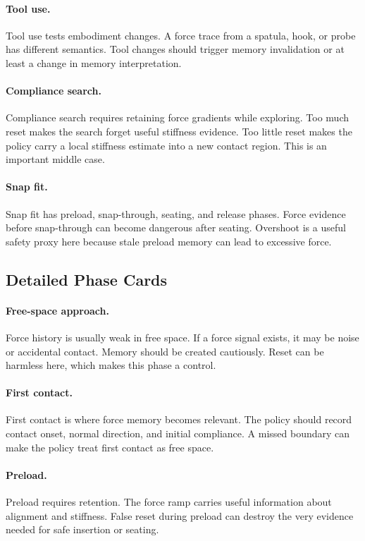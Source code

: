 \documentclass{article}
\begin{document}
\paragraph{Tool use.}
Tool use tests embodiment changes. A force trace from a spatula, hook, or probe
has different semantics. Tool changes should trigger memory invalidation or at
least a change in memory interpretation.

\paragraph{Compliance search.}
Compliance search requires retaining force gradients while exploring. Too much
reset makes the search forget useful stiffness evidence. Too little reset makes
the policy carry a local stiffness estimate into a new contact region. This is
an important middle case.

\paragraph{Snap fit.}
Snap fit has preload, snap-through, seating, and release phases. Force evidence
before snap-through can become dangerous after seating. Overshoot is a useful
safety proxy here because stale preload memory can lead to excessive force.

\subsection{Detailed Phase Cards}

\paragraph{Free-space approach.}
Force history is usually weak in free space. If a force signal exists, it may be
noise or accidental contact. Memory should be created cautiously. Reset can be
harmless here, which makes this phase a control.

\paragraph{First contact.}
First contact is where force memory becomes relevant. The policy should record
contact onset, normal direction, and initial compliance. A missed boundary can
make the policy treat first contact as free space.

\paragraph{Preload.}
Preload requires retention. The force ramp carries useful information about
alignment and stiffness. False reset during preload can destroy the very
evidence needed for safe insertion or seating.
\end{document}
